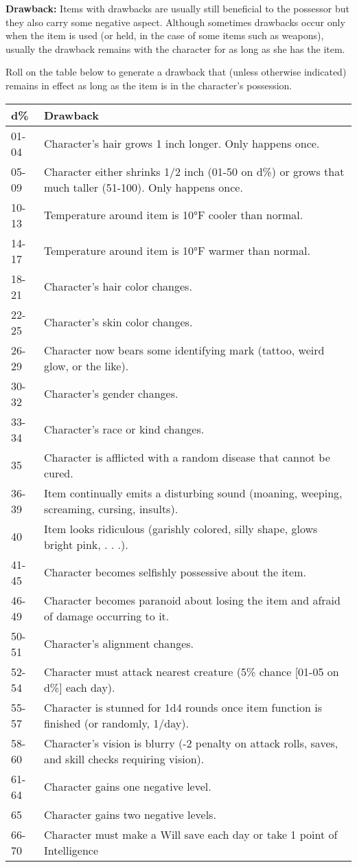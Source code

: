 \documentclass{article}
\begin{document}
\textbf{Drawback:} Items with drawbacks are usually still beneficial to the possessor 
but they also carry some negative aspect. Although sometimes drawbacks occur only 
when the item is used (or held, in the case of some items such as weapons), usually 
the drawback remains with the character for as long as she has the item.

Roll on the table below to generate a drawback that (unless otherwise indicated) 
remains in effect as long as the item is in the character's possession.

\begin{tabular}{|>{\raggedright}p{22pt}|>{\raggedright}p{304pt}|}
\hline
d\textbf{\%} & D\textbf{rawback}\tabularnewline
\hline
01-04 & Character's hair grows 1 inch longer. Only happens once.\tabularnewline
\hline
05-09 & Character either shrinks 1/2 inch (01-50 on d\%) or grows that much taller 
(51-100). Only happens once.\tabularnewline
\hline
10-13 & Temperature around item is 10°F cooler than normal.\tabularnewline
\hline
14-17 & Temperature around item is 10°F warmer than normal.\tabularnewline
\hline
18-21 & Character's hair color changes.\tabularnewline
\hline
22-25 & Character's skin color changes.\tabularnewline
\hline
26-29 & Character now bears some identifying mark (tattoo, weird glow, or the like).\tabularnewline
\hline
30-32 & Character's gender changes.\tabularnewline
\hline
33-34 & Character's race or kind changes.\tabularnewline
\hline
35 & Character is afflicted with a random disease that cannot be cured.\tabularnewline
\hline
36-39 & Item continually emits a disturbing sound (moaning, weeping, screaming, 
cursing, insults).\tabularnewline
\hline
40 & Item looks ridiculous (garishly colored, silly shape, glows bright pink, . 
. .).\tabularnewline
\hline
41-45 & Character becomes selfishly possessive about the item.\tabularnewline
\hline
46-49 & Character becomes paranoid about losing the item and afraid of damage occurring 
to it.\tabularnewline
\hline
50-51 & Character's alignment changes.\tabularnewline
\hline
52-54 & Character must attack nearest creature (5\% chance [01-05 on d\%] each 
day).\tabularnewline
\hline
55-57 & Character is stunned for 1d4 rounds once item function is finished (or 
randomly, 1/day).\tabularnewline
\hline
58-60 & Character's vision is blurry (-2 penalty on attack rolls, saves, and skill 
checks requiring vision).\tabularnewline
\hline
61-64 & Character gains one negative level.\tabularnewline
\hline
65 & Character gains two negative levels.\tabularnewline
\hline
66-70 & Character must make a Will save each day or take 1 point of Intelligence 

\end{tabular}
\end{document}
